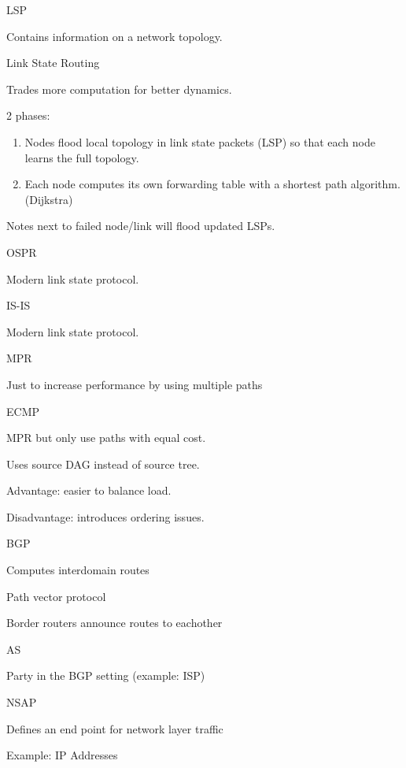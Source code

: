 \documentclass[main.tex]{subfiles}
\begin{document}
\begin{card}{LSP}
\item Contains information on a network topology.
\end{card}

\begin{card}{Link State Routing}
\item Trades more computation for better dynamics.
\item 2 phases:
    \begin{enumerate}
        \item Nodes flood local topology in link state packets (LSP) so that each node learns the full topology.
        \item Each node computes its own forwarding table with a shortest path algorithm. (Dijkstra)
    \end{enumerate}
\item Notes next to failed node/link will flood updated LSPs.
\end{card}

\begin{card}{OSPR}
\item Modern link state protocol.
\end{card}

\begin{card}{IS-IS}
\item Modern link state protocol.
\end{card}

\begin{card}{MPR}
\item Just to increase performance by using multiple paths
\end{card}

\begin{card}{ECMP}
\item MPR but only use paths with equal cost.
\item Uses source DAG instead of source tree.
\item Advantage: easier to balance load.
\item Disadvantage: introduces ordering issues.
\end{card}

\begin{card}{BGP}
\item Computes interdomain routes
\item Path vector protocol
\item Border routers announce routes to eachother
\end{card}

\begin{card}{AS}
\item Party in the BGP setting (example: ISP)
\end{card}

\begin{card}{NSAP}
\item Defines an end point for network layer traffic
\item Example: IP Addresses
\end{card}
\end{document}
